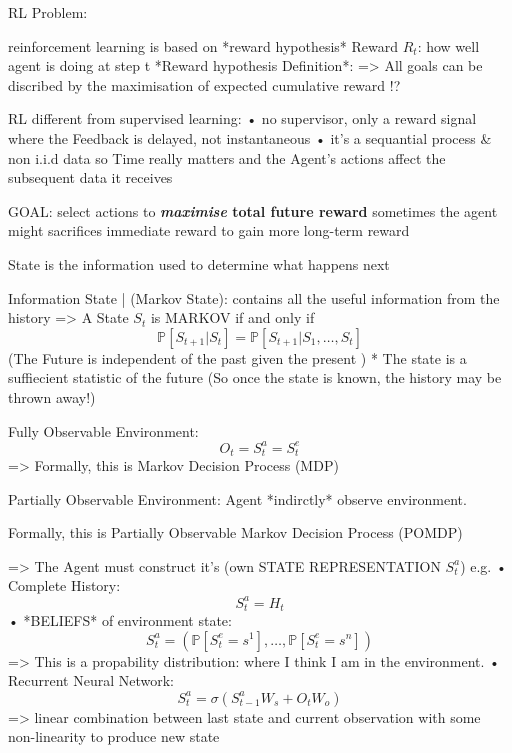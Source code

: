 RL Problem:

reinforcement learning is based on *reward hypothesis*
Reward \(R_t\): how well agent is doing at step t
*Reward hypothesis Definition*:
=> All goals can be discribed by the maximisation of expected cumulative reward !?

RL different from supervised learning:
• no supervisor, only a reward signal where the Feedback is delayed, not instantaneous
• it's a sequantial process \& non i.i.d data so Time really matters and the Agent’s actions affect the subsequent data it receives

GOAL: select actions to \textbf{\textit{maximise} total future reward}
sometimes the agent might sacrifices immediate reward to gain more long-term reward


State is the information used to determine what happens next

Information State | (Markov State): contains all the useful information from the history
=> A State \(S_t\) is MARKOV if and only if 
\begin{equation}
\mathbb{P}\left[S_{t+1} | S_{t}\right]=\mathbb{P}\left[S_{t+1} | S_{1}, \ldots, S_{t}\right]
\end{equation}
(The Future is independent of the past given the present )
* The state is a suffiecient statistic of the future (So once the state is known, the history may be thrown away!)


Fully Observable Environment: \begin{equation}
O_{t}=S_{t}^{a}=S_{t}^{e}
\end{equation} => Formally, this is Markov Decision Process (MDP)

Partially Observable Environment: Agent *indirctly* observe environment.

Formally, this is Partially Observable Markov Decision Process (POMDP)

=> The Agent must construct it's (own STATE REPRESENTATION \(S_t^a\)) e.g.
• Complete History: \begin{equation}
S_{t}^{a}=H_{t}
\end{equation}
• *BELIEFS* of environment state: \begin{equation}
S_{t}^{a}=\left(\mathbb{P}\left[S_{t}^{e}=s^{1}\right], \ldots, \mathbb{P}\left[S_{t}^{e}=s^{n}\right]\right)
\end{equation} => This is a propability distribution:  where I think I am in the environment.
• Recurrent Neural Network: \begin{equation}
S_{t}^{a}=\sigma\left(S_{t-1}^{a} W_{s}+O_{t} W_{o}\right)
\end{equation} => linear combination between last state and current observation with some non-linearity to produce new state 

